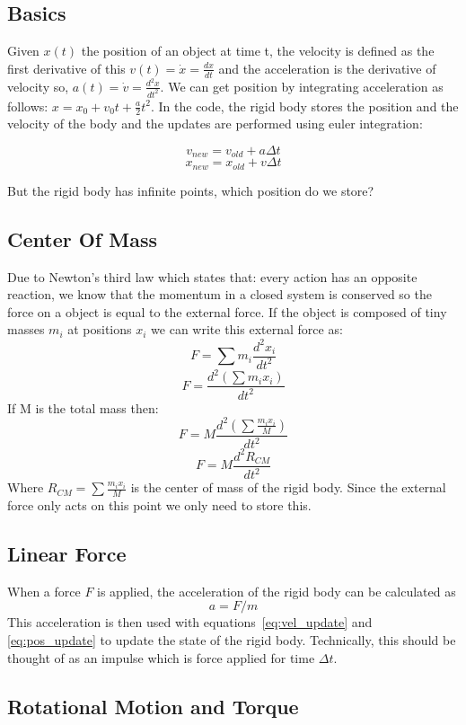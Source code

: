 \subsection{Basics}
Given $x(t)$ the position of an object at time t, the velocity is defined as the first derivative of this $v(t) = \dot{x} = \frac{dx}{dt}$ and the acceleration is the derivative of velocity so, $a(t) = \dot{v} = \frac{d^2x}{dt^2}$. We can get position by integrating acceleration as follows: $x = x_0 + v_0t + \frac{a}{2}t^2$. In the code, the rigid body stores the position and the velocity of the body and the updates are performed using euler integration:

\begin{equation}
\label{eq:vel_update}
v_{new} = v_{old} + a\Delta{t}
\end{equation}
\begin{equation}
\label{eq:pos_update}
x_{new} = x_{old} + v\Delta{t}
\end{equation}

But the rigid body has infinite points, which position do we store?

\subsection{Center Of Mass}
Due to Newton's third law which states that: every action has an opposite reaction, we know that the momentum in a closed system is conserved so the force on a object is equal to the external force. If the object is composed of tiny masses $m_i$ at positions $x_i$ we can write this external force as:
\[
F = \sum{m_i\frac{d^2x_i}{dt^2}}
\]
\[
F = \frac{d^2(\sum{m_ix_i})}{dt^2}
\]
If M is the total mass then:
\[
F = M\frac{d^2(\sum{\frac{m_ix_i}{M}})}{dt^2}
\]
\[
F = M\frac{d^2R_{CM}}{dt^2}
\]
Where $R_{CM} = \sum{\frac{m_ix_i}{M}}$ is the center of mass of the rigid body. Since the external force only acts on this point we only need to store this.

\subsection{Linear Force}
When a force $F$ is applied, the acceleration of the rigid body can be calculated as 
\[
a = F/m
\]
This acceleration is then used with equations~\ref{eq:vel_update} and \ref{eq:pos_update} to update the state of the rigid body. Technically, this should be thought of as an impulse which is force applied for time $\Delta t$.

\subsection{Rotational Motion and Torque}

